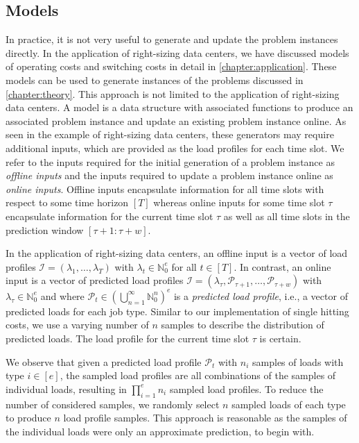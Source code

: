 \subsection{Models}

In practice, it is not very useful to generate and update the problem instances directly. In the application of right-sizing data centers, we have discussed models of operating costs and switching costs in detail in \cref{chapter:application}. These models can be used to generate instances of the problems discussed in \cref{chapter:theory}. This approach is not limited to the application of right-sizing data centers. A model is a data structure with associated functions to produce an associated problem instance and update an existing problem instance online. As seen in the example of right-sizing data centers, these generators may require additional inputs, which are provided as the load profiles for each time slot. We refer to the inputs required for the initial generation of a problem instance as \emph{offline inputs} and the inputs required to update a problem instance online as \emph{online inputs}. Offline inputs encapsulate information for all time slots with respect to some time horizon $[T]$ whereas online inputs for some time slot $\tau$ encapsulate information for the current time slot $\tau$ as well as all time slots in the prediction window $[\tau + 1 : \tau + w]$.

In the application of right-sizing data centers, an offline input is a vector of load profiles $\mathcal{I} = (\lambda_1, \dots, \lambda_T)$ with $\lambda_t \in \mathbb{N}_0^e$ for all $t \in [T]$. In contrast, an online input is a vector of predicted load profiles $\mathcal{I} = (\lambda_{\tau}, \mathcal{P}_{\tau + 1}, \dots, \mathcal{P}_{\tau + w})$ with $\lambda_{\tau} \in \mathbb{N}_0^e$ and where $\mathcal{P}_t \in \left(\bigcup_{n=1}^{\infty} \mathbb{N}_0^n\right)^e$ is a \emph{predicted load profile}, i.e., a vector of predicted loads for each job type. Similar to our implementation of single hitting costs, we use a varying number of $n$ samples to describe the distribution of predicted loads. The load profile for the current time slot $\tau$ is certain.

We observe that given a predicted load profile $\mathcal{P}_t$ with $n_i$ samples of loads with type $i \in [e]$, the sampled load profiles are all combinations of the samples of individual loads, resulting in $\prod_{i=1}^e n_i$ sampled load profiles. To reduce the number of considered samples, we randomly select $n$ sampled loads of each type to produce $n$ load profile samples. This approach is reasonable as the samples of the individual loads were only an approximate prediction, to begin with.

